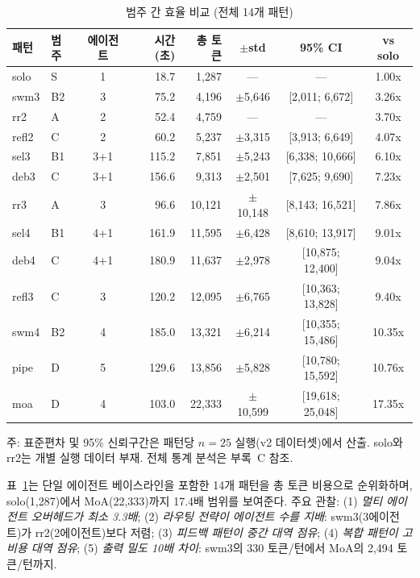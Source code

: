 \begin{table}[H]
\centering
\caption{범주 간 효율 비교 (전체 14개 패턴)}
\label{tab:all-patterns}
{\footnotesize
\begin{tabular}{llcrrccc}
\toprule
패턴 & 범주 & 에이전트 & 시간(초) & 총 토큰 & $\pm$std & 95\% CI & vs solo \\
\midrule
solo  & S  & 1   & 18.7  & 1,287  & ---       & ---               & 1.00x \\
swm3  & B2 & 3   & 75.2  & 4,196  & $\pm$5,646 & [2,011; 6,672]   & 3.26x \\
rr2   & A  & 2   & 52.4  & 4,759  & ---       & ---               & 3.70x \\
refl2 & C  & 2   & 60.2  & 5,237  & $\pm$3,315 & [3,913; 6,649]   & 4.07x \\
sel3  & B1 & 3+1 & 115.2 & 7,851  & $\pm$5,243 & [6,338; 10,666]  & 6.10x \\
deb3  & C  & 3+1 & 156.6 & 9,313  & $\pm$2,501 & [7,625; 9,690]   & 7.23x \\
rr3   & A  & 3   & 96.6  & 10,121 & $\pm$10,148 & [8,143; 16,521] & 7.86x \\
sel4  & B1 & 4+1 & 161.9 & 11,595 & $\pm$6,428 & [8,610; 13,917]  & 9.01x \\
deb4  & C  & 4+1 & 180.9 & 11,637 & $\pm$2,978 & [10,875; 12,400] & 9.04x \\
refl3 & C  & 3   & 120.2 & 12,095 & $\pm$6,765 & [10,363; 13,828] & 9.40x \\
swm4  & B2 & 4   & 185.0 & 13,321 & $\pm$6,214 & [10,355; 15,486] & 10.35x \\
pipe  & D  & 5   & 129.6 & 13,856 & $\pm$5,828 & [10,780; 15,592] & 10.76x \\
moa   & D  & 4   & 103.0 & 22,333 & $\pm$10,599 & [19,618; 25,048] & 17.35x \\
\bottomrule
\end{tabular}
}

\smallskip
{\footnotesize 주: 표준편차 및 95\% 신뢰구간은 패턴당 $n=25$ 실행(v2 데이터셋)에서 산출. solo와 rr2는 개별 실행 데이터 부재. 전체 통계 분석은 부록~C 참조.}
\end{table}

표~\ref{tab:all-patterns}는 단일 에이전트 베이스라인을 포함한 14개 패턴을 총 토큰 비용으로 순위화하며, solo(1,287)에서 MoA(22,333)까지 17.4배 범위를 보여준다. 주요 관찰: (1) \emph{멀티 에이전트 오버헤드가 최소 3.3배}; (2) \emph{라우팅 전략이 에이전트 수를 지배}: swm3(3에이전트)가 rr2(2에이전트)보다 저렴; (3) \emph{피드백 패턴이 중간 대역 점유}; (4) \emph{복합 패턴이 고비용 대역 점유}; (5) \emph{출력 밀도 10배 차이}: swm3의 330 토큰/턴에서 MoA의 2,494 토큰/턴까지.

